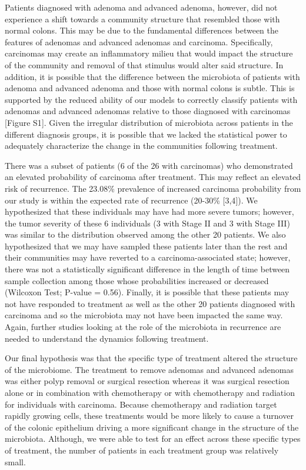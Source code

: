 \documentclass[12pt,]{article}
\begin{document}
Patients diagnosed with adenoma and advanced adenoma, however, did not
experience a shift towards a community structure that resembled those
with normal colons. This may be due to the fundamental differences
between the features of adenomas and advanced adenomas and carcinoma.
Specifically, carcinomas may create an inflammatory milieu that would
impact the structure of the community and removal of that stimulus would
alter said structure. In addition, it is possible that the difference
between the microbiota of patients with adenoma and advanced adenoma and
those with normal colons is subtle. This is supported by the reduced
ability of our models to correctly classify patients with adenomas and
advanced adenomas relative to those diagnosed with carcinomas {[}Figure
S1{]}. Given the irregular distribution of microbiota across patients in
the different diagnosis groups, it is possible that we lacked the
statistical power to adequately characterize the change in the
communities following treatment.

There was a subset of patients (6 of the 26 with carcinomas) who
demonstrated an elevated probability of carcinoma after treatment. This
may reflect an elevated risk of recurrence. The 23.08\% prevalence of
increased carcinoma probability from our study is within the expected
rate of recurrence (20-30\% {[}3,4{]}). We hypothesized that these
individuals may have had more severe tumors; however, the tumor severity
of these 6 individuals (3 with Stage II and 3 with Stage III) was
similar to the distribution observed among the other 20 patients. We
also hypothesized that we may have sampled these patients later than the
rest and their communities may have reverted to a carcinoma-associated
state; however, there was not a statistically significant difference in
the length of time between sample collection among those whose
probabilities increased or decreased (Wilcoxon Test; P-value = 0.56).
Finally, it is possible that these patients may not have responded to
treatment as well as the other 20 patients diagnosed with carcinoma and
so the microbiota may not have been impacted the same way. Again,
further studies looking at the role of the microbiota in recurrence are
needed to understand the dynamics following treatment.

Our final hypothesis was that the specific type of treatment altered the
structure of the microbiome. The treatment to remove adenomas and
advanced adenomas was either polyp removal or surgical resection whereas
it was surgical resection alone or in combination with chemotherapy or
with chemotherapy and radiation for individuals with carcinoma. Because
chemotherapy and radiation target rapidly growing cells, these
treatments would be more likely to cause a turnover of the colonic
epithelium driving a more significant change in the structure of the
microbiota. Although, we were able to test for an effect across these
specific types of treatment, the number of patients in each treatment
group was relatively small.
\end{document}
